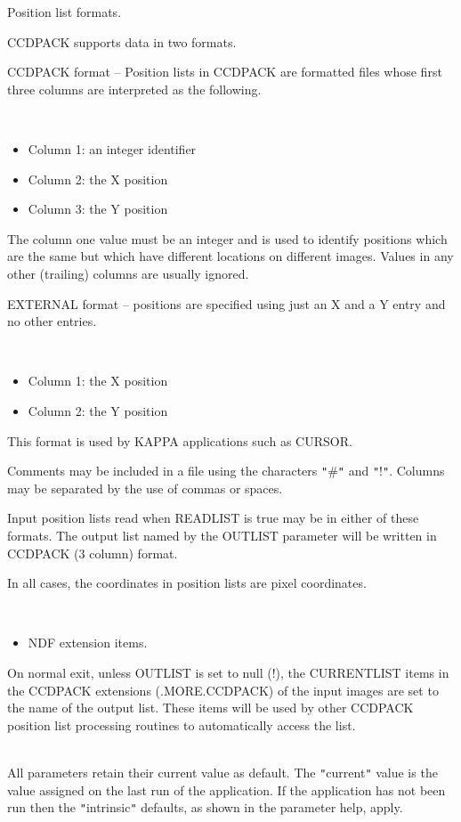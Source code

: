 \documentclass[twoside,11pt]{article}
\newcommand{\xref}[3]{#1}
\renewcommand{\_}{\texttt{\symbol{95}}}
\newcommand{\qt}[1]{{\tt "}#1{\tt "}}
\newcommand{\sstdiytopic}[2]{\item[#1:] \mbox{} \\[1.3ex] #2}
\newcommand{\sstitemlist}[1]{
  \mbox{} \\
  \vspace{-3.5ex}
  \begin{itemize}
     #1
  \end{itemize}
}
\newcommand{\sstitem}{\item}
\newcommand{\sstdiytopic}[2]{\item[{#1}] #2 }
\newcommand{\sstitemlist}[1]{
      \begin{itemize}
         #1
      \end{itemize}
      \\
   }
\newcommand{\sstitem}{\item}
\begin{document}
{{{         \sstitem
         Position list formats.

      }
        CCDPACK supports data in two formats.

        CCDPACK format -- Position lists in CCDPACK are formatted files
        whose first three columns are interpreted as the following.

      \sstitemlist{

         \sstitem
              Column 1: an integer identifier

         \sstitem
              Column 2: the X position

         \sstitem
              Column 3: the Y position

      }
        The column one value must be an integer and is used to identify
        positions which are the same but which have different locations
        on different images. Values in any other (trailing) columns are
        usually ignored.

        EXTERNAL format -- positions are specified using just an X and
        a Y entry and no other entries.

      \sstitemlist{

         \sstitem
           Column 1: the X position

         \sstitem
           Column 2: the Y position
      }

        This format is used by \xref{KAPPA}{sun95}{} applications such as 
        \xref{CURSOR}{sun95}{CURSOR}.

        Comments may be included in a file using the characters \qt{\#} and
        \qt{!}. Columns may be separated by the use of commas or spaces.

        Input position lists read when READLIST is true may be in either
        of these formats.  The output list named by the OUTLIST
        parameter will be written in CCDPACK (3 column) format.

        In all cases, the coordinates in position lists are pixel
        coordinates.


      \sstitemlist{

         \sstitem
         NDF extension items.

      }
        On normal exit, unless OUTLIST is set to null (!), the 
        CURRENT\_LIST items in the CCDPACK extensions (.MORE.CCDPACK) of 
        the input images are set to the name of the output list. These 
        items will be used by other CCDPACK position list processing 
        routines to automatically access the list.
   }
   \sstdiytopic{
      Behaviour of parameters
   }{
      All parameters retain their current value as default. The
      \qt{current} value is the value assigned on the last run of the
      application. If the application has not been run then the
      \qt{intrinsic} defaults, as shown in the parameter help, apply.

}}
\end{document}
